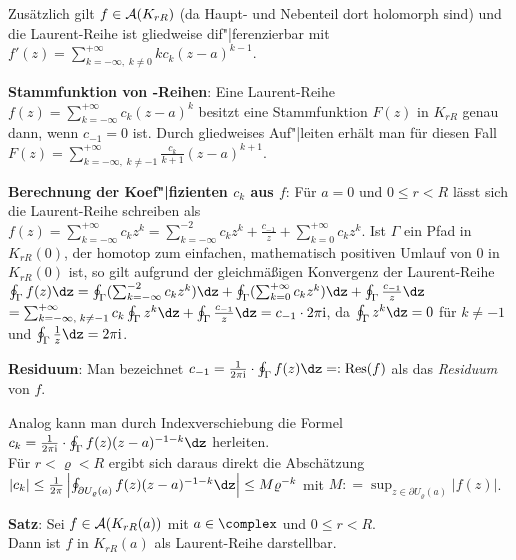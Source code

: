 Zusätzlich gilt $f \in \mathcal{A}(K_{rR})$
(da Haupt- und Nebenteil dort holomorph sind) und
die Laurent-Reihe ist gliedweise dif"|ferenzierbar mit
$f'(z) = \sum_{k=-\infty,\;k\not=0}^{+\infty} k c_k (z - a)^{k-1}$.

\textbf{Stammfunktion von -Reihen}:
Eine Laurent-Reihe $f(z) = \sum_{k=-\infty}^{+\infty} c_k (z - a)^k$
besitzt eine Stammfunktion $F(z)$ in $K_{rR}$ genau dann, wenn
$c_{-1} = 0$ ist.
Durch gliedweises Auf"|leiten erhält man für diesen Fall
$F(z) = \sum_{k=-\infty,\;k\not=-1}^{+\infty} \frac{c_k}{k + 1} (z - a)^{k+1}$.

\linie
\pagebreak

\textbf{Berechnung der Koef"|fizienten $c_k$ aus $f$}:
Für $a = 0$ und $0 \le r < R$ lässt sich die Laurent-Reihe schreiben als
$f(z) = \sum_{k=-\infty}^{+\infty} c_k z^k =
\sum_{k=-\infty}^{-2} c_k z^k + \frac{c_{-1}}{z} +
\sum_{k=0}^{+\infty} c_k z^k$.
Ist $\Gamma$ ein Pfad in $K_{rR}(0)$, der homotop zum einfachen, mathematisch
positiven Umlauf von $0$ in $K_{rR}(0)$ ist, so gilt aufgrund der
gleichmäßigen Konvergenz der Laurent-Reihe\\
$\oint_\Gamma f(z)\dz =
\oint_\Gamma (\sum_{k=-\infty}^{-2} c_k z^k)\dz +
\oint_\Gamma (\sum_{k=0}^{+\infty} c_k z^k)\dz +
\oint_\Gamma \frac{c_{-1}}{z}\dz$\\
$= \sum_{k=-\infty,\;k\not=-1}^{+\infty} c_k \oint_\Gamma z^k \dz +
\oint_\Gamma \frac{c_{-1}}{z}\dz =
c_{-1} \cdot 2\pi\i$,
da $\oint_\Gamma z^k \dz = 0$ für $k \not= -1$
und $\oint_\Gamma \frac{1}{z}\dz = 2\pi\i$.

\textbf{Residuum}:
Man bezeichnet
$c_{-1} = \frac{1}{2\pi\i} \cdot \oint_\Gamma f(z) \dz =: \Res(f)$ als
das \emph{Residuum} von $f$.

Analog kann man durch Indexverschiebung die Formel
$c_k = \frac{1}{2\pi\i} \cdot \oint_\Gamma f(z)(z - a)^{-1-k}\dz$ herleiten.\\
Für $r < \varrho < R$ ergibt sich daraus direkt die Abschätzung\\
$|c_k| \le \frac{1}{2\pi}
\left|\oint_{\partial U_\varrho(a)} f(z)(z - a)^{-1-k}\dz\right| \le
M \varrho^{-k}$ mit $M : = \sup_{z \in \partial U_\varrho(a)} |f(z)|$.

\textbf{Satz}:
Sei $f \in \mathcal{A}(K_{rR}(a))$ mit $a \in \complex$ und $0 \le r < R$.\\
Dann ist $f$ in $K_{rR}(a)$ als Laurent-Reihe darstellbar.

\linie

